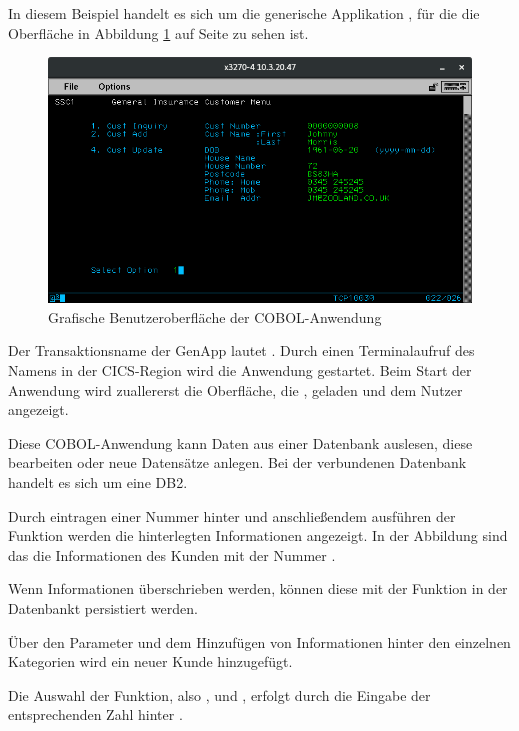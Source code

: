 In diesem Beispiel handelt es sich um die generische Applikation , für die die Oberfläche in Abbildung
\ref{fig:ibmad_map} auf Seite \pageref{fig:ibmad_map} zu sehen ist.

\begin{figure}[h]
  \centering
    \includegraphics[scale=0.5]{images/kapitel_4/ibmad_map.png}
  \caption{Grafische Benutzeroberfläche der COBOL-Anwendung}
  \label{fig:ibmad_map}
\end{figure}

Der Transaktionsname der GenApp lautet . Durch einen Terminalaufruf des Namens in der CICS-Region wird die
Anwendung gestartet. Beim Start der Anwendung wird zuallererst die Oberfläche, die , geladen und dem Nutzer
angezeigt.

Diese COBOL-Anwendung kann Daten aus einer Datenbank auslesen, diese bearbeiten oder neue Datensätze anlegen. Bei der
verbundenen Datenbank handelt es sich um eine DB2.

Durch eintragen einer Nummer hinter  und anschließendem ausführen der Funktion 
werden die hinterlegten Informationen angezeigt. In der Abbildung sind das die Informationen des Kunden mit der Nummer
.

Wenn Informationen überschrieben werden, können diese mit der Funktion  in der Datenbankt persistiert
werden.

Über den Parameter  und dem Hinzufügen von Informationen hinter den einzelnen Kategorien wird ein neuer
Kunde hinzugefügt.

Die Auswahl der Funktion, also ,  und , erfolgt durch die Eingabe der
entsprechenden Zahl hinter .

